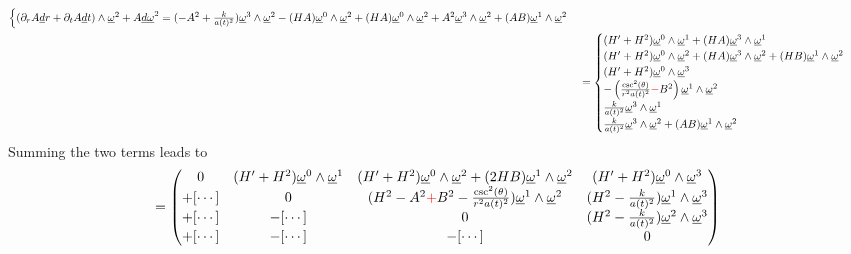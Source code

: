 \documentclass[10pt, a4paper]{article}
\begin{document}
{\begin{enumerate}
\begin{align*}
\begin{cases}
      (\partial_r A \underline{d}r  + \partial_t A \underline{d}t) \wedge \underline{\omega}^2 + A \underline{d\omega}^2 = (-A^2 + \frac{k}{a(t)^2}) \underline{\omega}^3 \wedge \underline{\omega}^2 - (HA) \underline{\omega}^0 \wedge \underline{\omega}^2 + (HA) \underline{\omega}^0 \wedge \underline{\omega}^2 + A^2 \underline{\omega}^3 \wedge \underline{\omega}^2 + (AB) \underline{\omega}^1 \wedge \underline{\omega}^2
    \end{cases}\\
    &=\begin{cases}
      (H'+H^2)\underline{\omega}^0 \wedge \underline{\omega}^1 + (HA)\underline{\omega}^3 \wedge \underline{\omega}^1\\
      (H' + H^2)\underline{\omega}^0 \wedge \underline{\omega}^2 + (HA)\underline{\omega}^3 \wedge \underline{\omega}^2 + (HB) \underline{\omega}^1 \wedge \underline{\omega}^2\\ 
      (H' + H^2) \underline{\omega}^0 \wedge \underline{\omega}^3\\
      -\left(\frac{\csc^2(\theta)}{r^2 a(t)^2} \textcolor{red}{-} B^2 \right)\underline{\omega}^1 \wedge \underline{\omega}^2\\
      \frac{k}{a(t)^2} \underline{\omega}^3 \wedge \underline{\omega}^1\\
      \frac{k}{a(t)^2} \underline{\omega}^3 \wedge \underline{\omega}^2 + (AB) \underline{\omega}^1 \wedge \underline{\omega}^2
    \end{cases}
  \end{align*}
  Summing the two terms leads to 
  \begin{align*}
    [\underline{R}^a{}_b] =
    \begin{pmatrix}
      0 & (H'+H^2)\underline{\omega}^0 \wedge \underline{\omega}^1  & (H' + H^2)\underline{\omega}^0 \wedge \underline{\omega}^2 + (2HB) \underline{\omega}^1 \wedge \underline{\omega}^2 & (H' + H^2) \underline{\omega}^0 \wedge \underline{\omega}^3\\
      +[\cdots] & 0 & (H^2-A^2 \textcolor{red}{+} B^2 -\frac{\csc^2(\theta)}{r^2 a(t)^2})\underline{\omega}^1 \wedge \underline{\omega}^2 & (H^2-\frac{k}{a(t)^2}) \underline{\omega}^1\wedge \underline{\omega}^3\\
      +[\cdots] & -[\cdots] & 0 & (H^2-\frac{k}{a(t)^2})\underline{\omega}^2\wedge \underline{\omega}^3\\
      +[\cdots] & -[\cdots] & -[\cdots] & 0
    \end{pmatrix} 

\end{align*}
\end{enumerate}}
\end{document}
